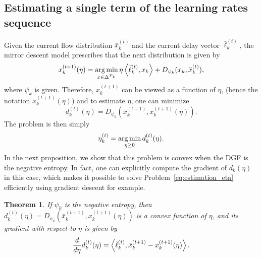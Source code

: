 \documentclass{sig-alternate-ipsn13}
\newtheorem{theorem}{Theorem}
\begin{document}
\subsection{Estimating a single term of the learning rates sequence}
Given the current flow distribution $\bar x^{(t)}_k$ and the current delay vector $\bar \ell^{(t)}_k$, the mirror descent model prescribes that the next distribution is given by
\begin{equation}
\label{eq:MD_update_estimation}
x_k^{(t+1)}(\eta) = \operatorname*{arg\,min}_{x \in \Delta^{\mathcal{P}_k}} \eta \left\langle \bar \ell_k^{(t)}, x_k \right\rangle + D_{\psi_k}(x_k, \bar x^{(t)}_k),
\end{equation}
where $\psi_k$ is given. Therefore, $x^{(t+1)}_k$ can be viewed as a function of $\eta$, (hence the notation $x_k^{(t+1)}(\eta)$) and to estimate $\eta$, one can minimize
\[
d^{(t)}_k(\eta) = D_{\psi_k}(\bar x_k^{(t+1)}, x_k^{(t+1)}(\eta)).
\]
The problem is then simply
\begin{equation}
\label{eq:estimation_eta}
\eta_k^{(t)} = \operatorname*{arg\,min}_{\eta \geq 0} d^{(t)}_k(\eta).
\end{equation}
In the next proposition, we show that this problem is convex when the DGF is the negative entropy. In fact, one can explicitly compute the gradient of $d_k(\eta)$ in this case, which makes it possible to solve Problem~\eqref{eq:estimation_eta} efficiently using gradient descent for example.
\begin{theorem}
If $\psi_k$ is the negative entropy, then $d_k^{(t)}(\eta) = D_{\psi_k}(\bar x_k^{(t+1)}, x_k^{(t+1)}(\eta))$ is a convex function of $\eta$, and its gradient with respect to $\eta$ is given by
\[
\frac{d}{d\eta} d_k^{(t)}(\eta) = \left\langle \bar \ell^{(t)}_{k}, {\bar x^{(t+1)}_k} - x^{(t+1)}_k(\eta) \right\rangle.
\]
\end{theorem}
\end{document}

